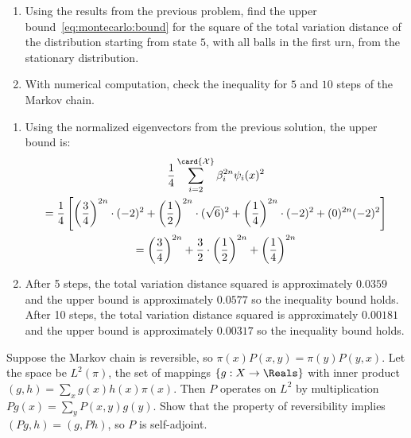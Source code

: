 \documentclass[12pt]{article}
\begin{document}
\begin{exercise}
    \begin{enumerate}[label=(\alph*)]
    \item
        Using the results from the previous problem, find the upper
        bound~\eqref{eq:montecarlo:bound} for the square of the total
        variation distance of the distribution starting from state \( 5 \),
        with all balls in the first urn, from the stationary
        distribution.
    \item
        With numerical computation, check the inequality for \( 5 \) and
        \( 10 \) steps of the Markov chain.
\end{enumerate}
\end{exercise}
\begin{solution}
    \begin{enumerate}[label=(\alph*)]
    \item
        Using the normalized eigenvectors from the previous solution,
        the upper bound is:
        \begin{multline*}
            \frac{1}{4} \sum\limits_{i=2}^{\card{\mathcal{X}}} \beta_i^{2n}
            \psi_i(x)^2 \\
            = \frac{1}{4} \left[ \left(\frac{3}{4} \right)^{2n} \cdot (-2)^
            {2} + \left( \frac{1}{2} \right)^{2n} \cdot (\sqrt {6})^2 +
            \left(\frac{1}{4} \right)^{2n} \cdot (-2)^{2} + (0)^ {2n} (-2)^
            {2} \right] \\
            = \left( \frac{3}{4} \right)^{2n} + \frac{3}{2} \cdot \left(
            \frac{1}{2} \right)^{2n} + \left( \frac{1}{4} \right)^{2n}
        \end{multline*}
    \item
        After 5 steps, the total variation distance squared is
        approximately \( 0.0359 \) and the upper bound is approximately \(
        0.0577 \) so the inequality bound holds.  After 10 steps, the
        total variation distance squared is approximately \( 0.00181 \)
        and the upper bound is approximately \( 0.00317 \) so the
        inequality bound holds.
\end{enumerate}

\end{solution}
\begin{exercise}
    Suppose the Markov chain is reversible, so \( \pi(x) P(x,y) = \pi(y)
    P(y,x) \).  Let the space be \( L^2(\pi) \), the set of mappings \(
    \{g :  X \to \Reals \} \) with inner product \( (g,h) = \sum\limits_
    {x}g(x) h(x) \pi(x) \).  Then \( P \) operates on \( L^2 \) by
    multiplication \( Pg(x) = \sum\limits_y P(x,y) g(y) \).  Show that
    the property of reversibility implies \( (Pg,h) = (g,Ph) \), so \( P
    \) is self-adjoint.
\end{exercise}
\end{document}
